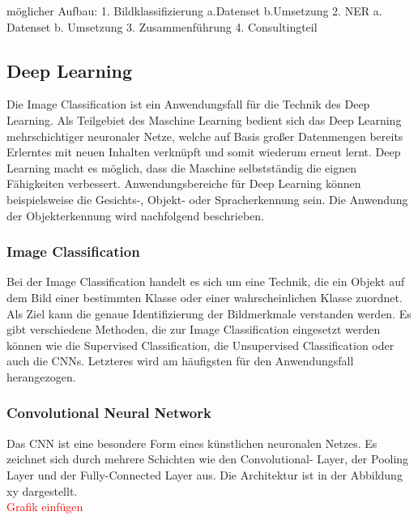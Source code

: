 möglicher Aufbau:
1.	Bildklassifizierung
a.Datenset
b.Umsetzung
2.	NER
a.	Datenset
b.	Umsetzung
3.	Zusammenführung
4.	Consultingteil

\subsection{Deep Learning}

Die Image Classification ist ein Anwendungsfall für die Technik des Deep Learning.
Als Teilgebiet des Maschine Learning bedient sich das Deep Learning mehrschichtiger neuronaler Netze, welche auf Basis großer Datenmengen bereits Erlerntes mit neuen Inhalten verknüpft und somit wiederum erneut lernt. Deep Learning macht es möglich, dass die Maschine selbstständig die eignen Fähigkeiten verbessert.
Anwendungsbereiche für Deep Learning können beispielsweise die Gesichts-, Objekt- oder Spracherkennung sein. Die Anwendung der Objekterkennung wird nachfolgend beschrieben.

\subsubsection{Image Classification}
Bei der Image Classification handelt es sich um eine Technik, die ein Objekt auf dem Bild einer bestimmten Klasse oder einer wahrscheinlichen Klasse zuordnet. Als Ziel kann die genaue Identifizierung der Bildmerkmale verstanden werden.
Es gibt verschiedene Methoden, die zur Image Classification eingesetzt werden können wie die Supervised Classification, die Unsupervised Classification oder auch die \acp{CNN}. Letzteres wird am häufigsten für den Anwendungsfall herangezogen.

\subsubsection{Convolutional Neural Network}
Das \ac{CNN} ist eine besondere Form eines künstlichen neuronalen Netzes.
Es zeichnet sich durch mehrere Schichten wie den Convolutional- Layer, der Pooling Layer und der Fully-Connected Layer aus. Die Architektur ist in der Abbildung xy dargestellt.
\\
\textcolor{red}{Grafik einfügen} \\


